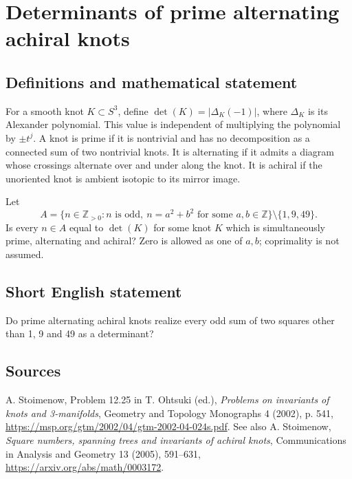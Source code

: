 \documentclass{article}
\begin{document}
\section*{Determinants of prime alternating achiral knots}
\subsection{Definitions and mathematical statement}
For a smooth knot $K\subset S^3$, define
$\det(K)=|\Delta_K(-1)|$, where $\Delta_K$ is its Alexander polynomial.
This value is independent of multiplying the polynomial by $\pm t^j$.
A knot is prime if it is nontrivial and has no decomposition as a connected
sum of two nontrivial knots. It is alternating if it admits a diagram
whose crossings alternate over and under along the knot. It is achiral
if the unoriented knot is ambient isotopic to its mirror image.

Let
\[
 A=\{n\in\mathbb Z_{>0}:n\text{ is odd},\ n=a^2+b^2
 \text{ for some }a,b\in\mathbb Z\}\setminus\{1,9,49\}.
\]
Is every $n\in A$ equal to $\det(K)$ for some knot $K$ which is
simultaneously prime, alternating and achiral? Zero is allowed as one
of $a,b$; coprimality is not assumed.
\subsection{Short English statement}
Do prime alternating achiral knots realize every odd sum of two squares other than 1, 9 and 49 as a determinant?
\subsection{Sources}
A. Stoimenow, Problem 12.25 in T. Ohtsuki (ed.),
\emph{Problems on invariants of knots and 3-manifolds}, Geometry and Topology
Monographs 4 (2002), p. 541,
\url{https://msp.org/gtm/2002/04/gtm-2002-04-024s.pdf}.
See also A. Stoimenow, \emph{Square numbers, spanning trees and invariants
of achiral knots}, Communications in Analysis and Geometry 13 (2005),
591--631, \url{https://arxiv.org/abs/math/0003172}.
\end{document}
